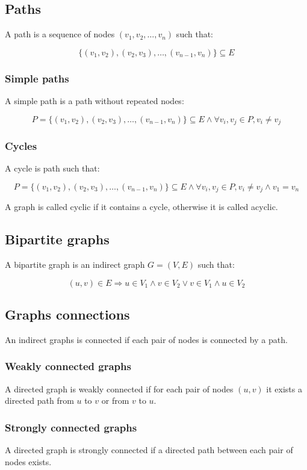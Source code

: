 	\subsection{Paths}
	A path is a sequence of nodes $(v_1,v_2,\dots,v_n)$ such that:

	$$\{(v_1,v_2), (v_2, v_3), \dots, (v_{n-1}, v_n)\}\subseteq E$$

		\subsubsection{Simple paths}
		A simple path is a path without repeated nodes:

		$$P=\{(v_1,v_2), (v_2, v_3), \dots, (v_{n-1}, v_n)\}\subseteq E\land\forall v_i,v_j\in P, v_i\neq v_j$$

		\subsubsection{Cycles}
		A cycle is path such that:

		$$P=\{(v_1,v_2), (v_2, v_3), \dots, (v_{n-1}, v_n)\}\subseteq E\land\forall v_i,v_j\in P, v_i\neq v_j\land v_1=v_n$$

		A graph is called cyclic if it contains a cycle, otherwise it is called acyclic.

	\subsection{Bipartite graphs}
	A bipartite graph is an indirect graph $G = (V,E)$ such that:

	$$(u,v)\in E\Rightarrow  u\in V_1 \land v\in V_2\lor v\in V_1\land u\in V_2$$

	\subsection{Graphs connections}
	An indirect graphs is connected if each pair of nodes is connected by a path.

		\subsubsection{Weakly connected graphs}
		A directed graph is weakly connected if for each pair of nodes $(u,v)$ it exists a directed path from $u$ to $v$ or from $v$ to $u$.

		\subsubsection{Strongly connected graphs}
		A directed graph is strongly connected if a directed path between each pair of nodes exists.

